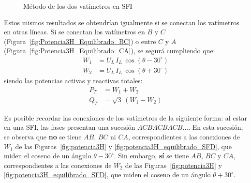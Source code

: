 \begin{figure}[H]
    \centering
    \centering{}\hfill
    \hfill
    \caption{Método de los dos vatímetros en SFI}
    \label{fig:potencia3H_equilibrado_SFI}
\end{figure}

Estos mismos resultados se obtendrían igualmente si se conectan los vatímetros en otras líneas. Si se conectan los vatímetros en $B$ y $C$ (Figura~\ref{fig:Potencia3H_Equilibrado_BC}) o entre $C$ y $A$ (Figura~\ref{fig:Potencia3H_Equilibrado_CA}), se segurá cumpliendo que: 
\begin{align*}
    W_1&=U_L\,I_L\,\cos(\theta-30^\circ) \\
    W_2&=U_L\,I_L\,\cos(\theta+30^\circ)
\end{align*}
siendo las potencias activas y reactivas totales: 
\begin{align*}
    P_T&=W_1 + W_2\\
    Q_T&=\sqrt{3}\,(W_1 - W_2)
\end{align*}

\begin{remark}
    Es posible recordar las conexiones de los vatímetros de la siguiente forma: al estar en una SFI, las fases presentan una sucesión $ACBACBACB$.... En esta sucesión, se observa que {\color{red}\textbf{no}} se tiene $AB$, $BC$ ni $CA$, correspondientes a las conexiones de $W_1$ de las Figuras~\ref{fig:potencia3H} y \ref{fig:potencia3H_equilibrado_SFD}, que miden el coseno de un ángulo $\theta-30^\circ$. Sin embargo, {\color{red}\textbf{sí}} se tiene $AB$, $BC$ y $CA$, correspondientes a las conexiones de $W_2$ de las Figuras~\ref{fig:potencia3H} y \ref{fig:potencia3H_equilibrado_SFD}, que miden el coseno de un ángulo $\theta+30^\circ$.
\end{remark}


